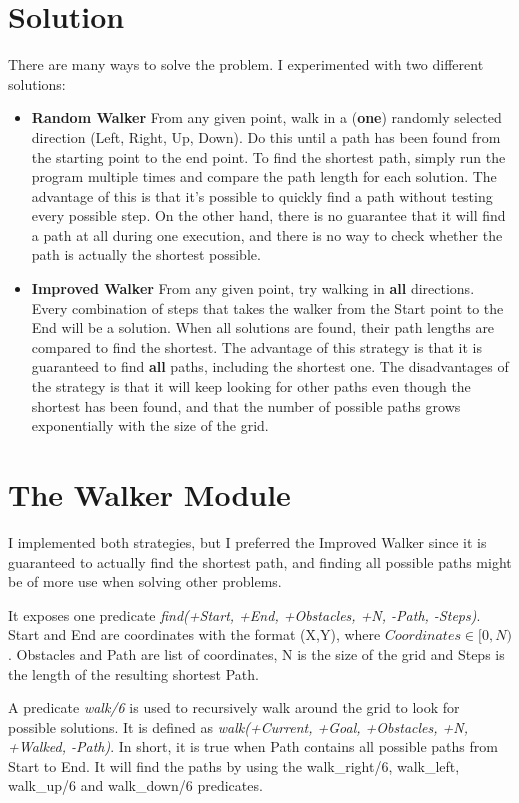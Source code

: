 \documentclass[a4paper]{article}
\begin{document}
\section{Solution}
There are many ways to solve the problem. I experimented with two different solutions:
\begin{itemize}
\item{\textbf{Random Walker}} From any given point, walk in a (\textbf{one}) randomly selected direction (Left, Right, Up, Down). Do this until a path has been found from the starting point to the end point. To find the shortest path, simply run the program multiple times and compare the path length for each solution. The advantage of this is that it's possible to quickly find a path without testing every possible step. On the other hand, there is no guarantee that it will find a path at all during one execution, and there is no way to check whether the path is actually the shortest possible.

\item{\textbf{Improved Walker}} From any given point, try walking in \textbf{all} directions. Every combination of steps that takes the walker from the Start point to the End will be a solution. When all solutions are found, their path lengths are compared to find the shortest. The advantage of this strategy is that it is guaranteed to find \textbf{all} paths, including the shortest one. The disadvantages of the strategy is that it will keep looking for other paths even though the shortest has been found, and that the number of possible paths grows exponentially with the size of the grid.
\end{itemize}

\section{The Walker Module}
I implemented both strategies, but I preferred the Improved Walker since it is guaranteed to actually find the shortest path, and finding all possible paths might be of more use when solving other problems.

It exposes one predicate \textit{find(+Start, +End, +Obstacles, +N, -Path, -Steps)}. Start and End are coordinates with the format (X,Y), where  ${Coordinates \in [0,N)}$. Obstacles and Path are list of coordinates, N is the size of the grid and Steps is the length of the resulting shortest Path.

A predicate \textit{walk/6} is used to recursively walk around the grid to look for possible solutions. It is defined as \textit{walk(+Current, +Goal, +Obstacles, +N, +Walked, -Path)}. In short, it is true when Path contains all possible paths from Start to End. It will find the paths by using the walk\_right/6, walk\_left, walk\_up/6 and walk\_down/6 predicates.
\end{document}
